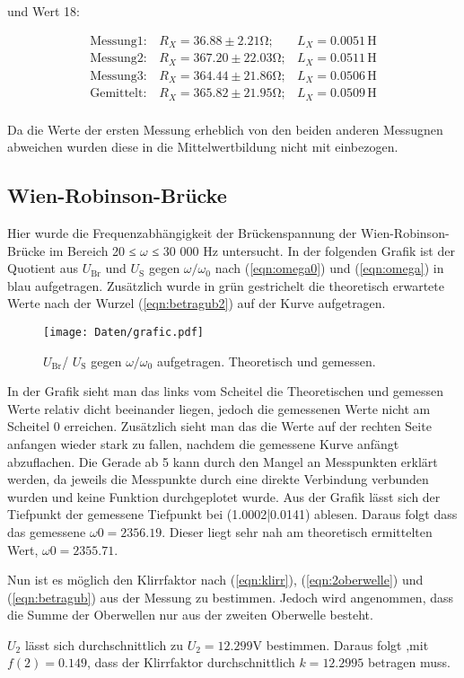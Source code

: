und Wert 18:

\begin{align*}
\text{Messung}1:& R_X = 36.88  \pm 2.21  \si{\ohm};& L_X =  0.0051 \, \si{\henry}\\
\text{Messung}2:& R_X = 367.20 \pm 22.03 \si{\ohm};& L_X =  0.0511 \, \si{\henry}\\
\text{Messung}3:& R_X = 364.44 \pm 21.86 \si{\ohm};& L_X =  0.0506 \, \si{\henry}\\
\text{Gemittelt}:& R_X= 365.82 \pm 21.95 \si{\ohm};& L_X =  0.0509 \, \si{\henry}\\
\end{align*}

Da die Werte der ersten Messung erheblich von den beiden anderen Messugnen abweichen wurden diese in die Mittelwertbildung nicht mit einbezogen.

\newpage
\subsection{Wien-Robinson-Brücke}

Hier wurde die Frequenzabhängigkeit der Brückenspannung der Wien-Robinson-Brücke im Bereich 20 ≤ $\omega$ ≤ 30 000 Hz untersucht. 
In der folgenden Grafik ist der Quotient aus $U_\text{Br}$ und $U_\text{S}$ gegen $\omega/\omega_0$ nach (\ref{eqn:omega0}) und (\ref{eqn:omega}) in blau aufgetragen.
Zusätzlich wurde in grün gestrichelt die theoretisch erwartete Werte nach der Wurzel (\ref{eqn:betragub2}) auf der Kurve aufgetragen.
\begin{figure}
    \centering
    \texttt{[image: Daten/grafic.pdf]}
    \caption{$U_\text{Br}$/ $U_\text{S}$ gegen $\omega/\omega_0$ aufgetragen. Theoretisch und gemessen.}
\end{figure}

In der Grafik sieht man das links vom Scheitel die Theoretischen und gemessen Werte relativ dicht beeinander liegen, jedoch die gemessenen Werte nicht am Scheitel 0 erreichen. Zusätzlich
sieht man das die Werte auf der rechten Seite anfangen wieder stark zu fallen, nachdem die gemessene Kurve anfängt abzuflachen. Die Gerade ab 5 kann durch den Mangel an Messpunkten
erklärt werden, da jeweils die Messpunkte durch eine direkte Verbindung verbunden wurden und keine Funktion durchgeplotet wurde.
Aus der Grafik lässt sich der Tiefpunkt der gemessene Tiefpunkt bei (1.0002|0.0141) ablesen. 
Daraus folgt dass das gemessene $\omega0 = 2356.19$. Dieser liegt sehr nah am theoretisch ermittelten Wert, $\omega0 = 2355.71$. 

Nun ist es möglich den Klirrfaktor nach (\ref{eqn:klirr}), (\ref{eqn:2oberwelle}) und (\ref{eqn:betragub}) aus der Messung zu bestimmen. Jedoch wird angenommen, 
dass die Summe der Oberwellen nur aus der zweiten Oberwelle besteht.

$U_2$ lässt sich durchschnittlich zu $U_2 = 12.299 \si{\volt}$ bestimmen. Daraus folgt ,mit $f(2) = 0.149$, dass der Klirrfaktor durchschnittlich $k = 12.2995$ betragen muss.
